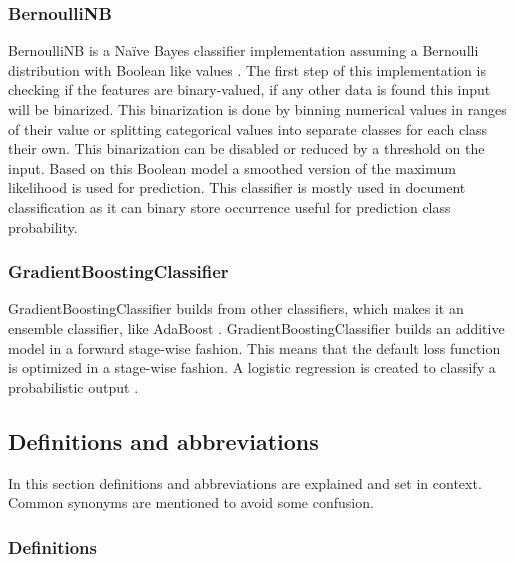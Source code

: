 \documentclass[a4paper,10pt]{article}
\begin{document}
\subsubsection{BernoulliNB}
BernoulliNB is a Naïve Bayes classifier implementation assuming a Bernoulli distribution with Boolean like values \cite{NB-text}. The first step of this implementation is checking if the features are binary-valued, if any other data is found this input will be binarized. This binarization is done by binning numerical values in ranges of their value or splitting categorical values into separate classes for each class their own. This binarization can be disabled or reduced by a threshold on the input. Based on this Boolean model a smoothed version of the maximum likelihood is used for prediction. This classifier is mostly used in document classification as it can binary store occurrence useful for prediction class probability.

\subsubsection{GradientBoostingClassifier}
GradientBoostingClassifier builds from other classifiers, which makes it an ensemble classifier, like AdaBoost \cite{GradientBoost}. GradientBoostingClassifier builds an additive model in a forward stage-wise fashion. This means that the default loss function is optimized in a stage-wise fashion. A logistic regression is created to classify a probabilistic output \cite{Greedy-GBC}. 





\subsection{Definitions and abbreviations}
In this section definitions and abbreviations are explained and set in context. Common synonyms are mentioned to avoid some confusion.
\subsubsection{Definitions}
\end{document}
